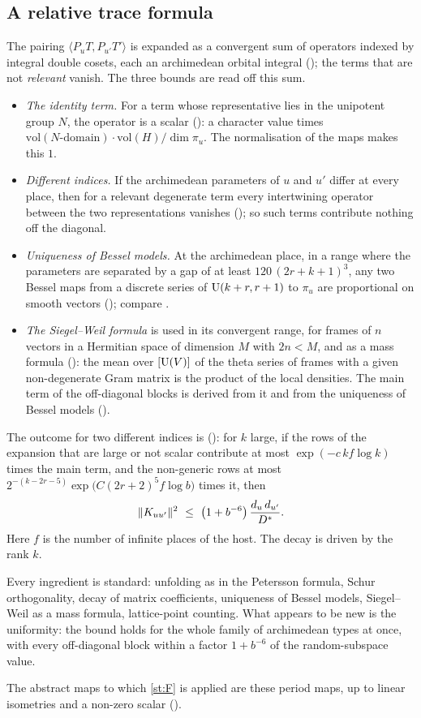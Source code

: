 \subsection{A relative trace formula}
The pairing $\langle P_uT,P_{u'}T'\rangle$ is expanded as a convergent sum of operators
indexed by integral double cosets, each an archimedean orbital integral \lvS{}
(); the terms that are not \emph{relevant} vanish. The three bounds are read
off this sum.
\begin{itemize}
\item \emph{The identity term.} For a term whose representative lies in the unipotent group
  $N$, the operator is a scalar \lvS{} (): a character value times
  $\mathrm{vol}(N\text{-domain})\cdot\mathrm{vol}(H)/\dim\pi_u$. The normalisation of the maps
  makes this $1$.
\item \emph{Different indices.} If the archimedean parameters of $u$ and $u'$ differ at every
  place, then for a relevant degenerate term every intertwining operator between the two
  representations vanishes \lvS{} (); so such terms contribute nothing off the
  diagonal.
\item \emph{Uniqueness of Bessel models.} At the archimedean place, in a range where the
  parameters are separated by a gap of at least $120\,(2r+k+1)^3$, any two Bessel maps from a
  discrete series of $\mathrm{U}(k+r,r+1)$ to $\pi_u$ are proportional on smooth vectors \lvS{}
  (); compare \cite{sunzhu2012,jsz2010}.
\item \emph{The Siegel--Weil formula} is used in its convergent range, for frames of $n$
  vectors in a Hermitian space of dimension $M$ with $2n<M$, and as a mass
  formula \lvS{} (): the mean over $[\mathrm{U}(V)]$ of the theta series of
  frames with a given non-degenerate Gram matrix is the product of the local densities. The
  main term of the off-diagonal blocks is derived from it and from the uniqueness of Bessel
  models ().
\end{itemize}
The outcome for two different indices is \lvS{} (): for $k$ large, if the
rows of the expansion that are large or not scalar contribute at most
$\exp(-c\,kf\log k)$ times the main term, and the non-generic rows at most
$2^{-(k-2r-5)}\exp\bigl(C(2r+2)^5f\log b\bigr)$ times it, then
\[
\norm{K_{uu'}}^2\ \le\ \bigl(1+b^{-6}\bigr)\,\frac{d_u\,d_{u'}}{D^*}.
\]
Here $f$ is the number of infinite places of the host. The decay is driven by the rank $k$.

Every ingredient is standard: unfolding as in the Petersson formula, Schur orthogonality,
decay of matrix coefficients, uniqueness of Bessel models, Siegel--Weil as a mass formula,
lattice-point counting. What appears to be new is the uniformity: the bound holds for the whole
family of archimedean types at once, with every off-diagonal block within a factor $1+b^{-6}$
of the random-subspace value.

The abstract maps to which \cref{st:F} is applied are these period maps, up to linear
isometries and a non-zero scalar \lvS{} ().
